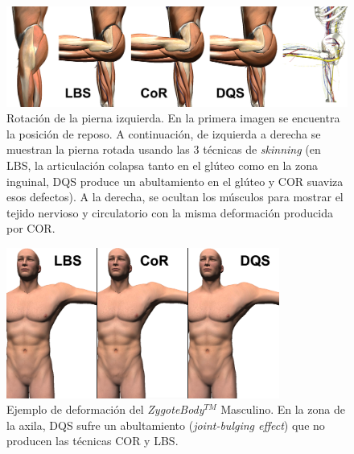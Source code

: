 \begin{figure}[ht]%
  \centering
  \includegraphics[width=\textwidth]{IMG/compculo}
    \caption{ Rotación de la pierna izquierda. En la primera imagen se encuentra la posición de reposo. A continuación, de izquierda a derecha se muestran la pierna rotada usando las 3 técnicas de \emph{skinning} (en \acs{LBS}, la articulación colapsa tanto en el glúteo como en la zona inguinal, \acs{DQS} produce un abultamiento en el glúteo y \acs{COR} suaviza esos defectos). A la derecha, se ocultan los músculos para mostrar el tejido nervioso y circulatorio con la misma deformación producida por \acs{COR}.}
    \label{fig:thigh_bending}
\end{figure}

\begin{figure}[ht]%
  \centering
  \includegraphics[width=0.8\textwidth]{IMG/sobaco.png}
    \caption{Ejemplo de deformación del  \emph{ZygoteBody}$^{TM}$ Masculino. En la zona de la axila, \acs{DQS} sufre un abultamiento (\emph{joint-bulging effect}) que no producen las técnicas \acs{COR} y \acs{LBS}. }
    \label{fig:axila}
\end{figure}






